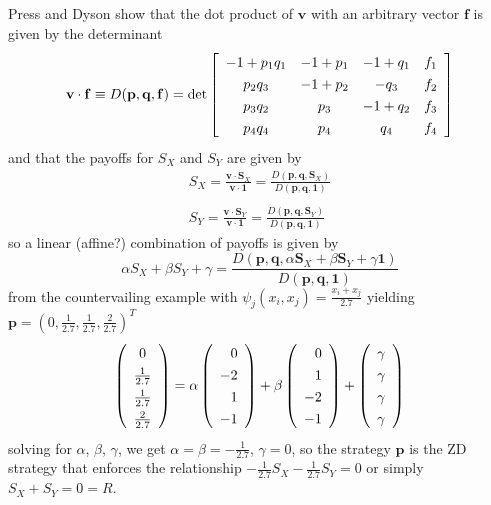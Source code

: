 Press and Dyson show that the dot product of $\mathbf{v}$ with an arbitrary vector $\mathbf{f}$ is given by the determinant
\[
\mathbf{v}\cdot \mathbf{f} \equiv D(\mathbf{p}, \mathbf{q}, \mathbf{f})
= \det
\left[
\begin{array}{c c c c}
-1 + p_1 q_1    &	-1 + p_1	&	-1 + q_1	&	f_1 \\
p_2 q_3         &	-1 + p_2	&	-q_3		&	f_2 \\
p_3 q_2 		&	p_3			&	-1 + q_2	&	f_3 \\
p_4 q_4			&	p_4			&	q_4			&	f_4
\end{array}
\right]
\]
and that the payoffs for $S_X$ and $S_Y$ are given by
\begin{align*}
S_X =
\frac{\mathbf{v} \cdot \mathbf{S}_X}{\mathbf{v} \cdot \mathbf{1}} =
\frac{D(\mathbf{p}, \mathbf{q}, \mathbf{S}_X)}{D(\mathbf{p}, \mathbf{q}, \mathbf{1})}
\\
\\
S_Y =
\frac{\mathbf{v} \cdot \mathbf{S}_Y}{\mathbf{v} \cdot \mathbf{1}} =
\frac{D(\mathbf{p}, \mathbf{q}, \mathbf{S}_Y)}{D(\mathbf{p}, \mathbf{q}, \mathbf{1})}
\end{align*}
so a linear (affine?) combination of payoffs is given by
\[
\alpha S_X + \beta S_Y + \gamma
=
\frac{D(\mathbf{p}, \mathbf{q}, \alpha\mathbf{S}_X + \beta\mathbf{S}_Y + \gamma \mathbf{1})}{D(\mathbf{p}, \mathbf{q}, \mathbf{1})}
\]
from the countervailing example with $\psi_j (x_i, x_j) = \frac{x_i + x_j}{2.7}$ yielding $\mathbf{p} = (0, \frac{1}{2.7}, \frac{1}{2.7}, \frac{2}{2.7})^T$
\[
\left(
\renewcommand{\arraystretch}{1.3}
\begin{array}{c}
0 \\
\frac{1}{2.7}\\
\frac{1}{2.7}\\
\frac{2}{2.7}
\end{array}
\right)
=
\alpha
\left(
\renewcommand{\arraystretch}{1.3}
\begin{array}{r}
0 \\
-2 \\
1\\
-1
\end{array}
\right)
+
\beta
\left(
\renewcommand{\arraystretch}{1.3}
\begin{array}{r}
0 \\
1 \\
-2\\
-1
\end{array}
\right)
+
\left(
\renewcommand{\arraystretch}{1.3}
\begin{array}{r}
\gamma \\
\gamma \\
\gamma \\
\gamma
\end{array}
\right)
\]
solving for $\alpha$, $\beta$, $\gamma$, we get $\alpha = \beta = -\frac{1}{2.7}$, $\gamma = 0$,
so the strategy $\mathbf{p}$ is the ZD strategy that enforces the relationship $-\frac{1}{2.7}S_X - \frac{1}{2.7}S_Y = 0$ or simply $S_X + S_Y = 0 = R$.






